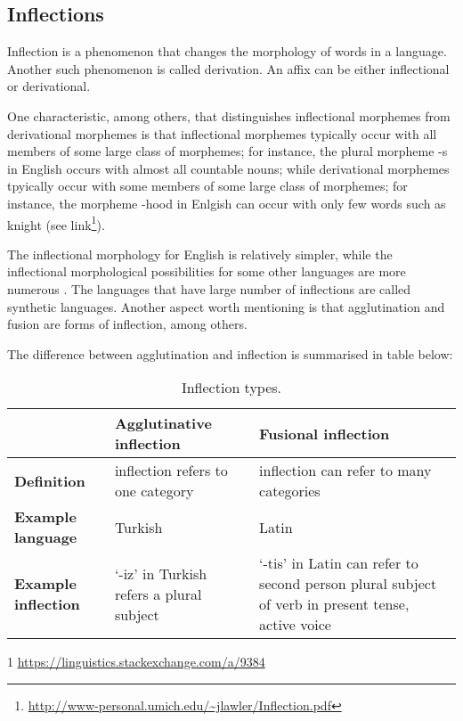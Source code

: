 \subsection{Inflections}
Inflection is a phenomenon that changes the morphology of words in a language. Another such phenomenon is called derivation. An affix can be either inflectional or derivational. 

One characteristic, among others, that distinguishes inflectional morphemes from derivational morphemes is that inflectional morphemes typically occur with all members of some large class of morphemes; for instance, the plural morpheme -s in English occurs with almost all countable nouns; while derivational morphemes tpyically occur with some members of some large class of morphemes; for instance, the morpheme -hood in Enlgish can occur with only few words such as knight (see link\footnote{\url{http://www-personal.umich.edu/~jlawler/Inflection.pdf}}).  

The inflectional morphology for English is relatively simpler, while the inflectional morphological possibilities for some other languages are more numerous \cite{indurkhya2010handbook}. The languages that have large number of inflections are called synthetic languages. Another aspect worth mentioning is that agglutination and fusion are forms of inflection, among others. 

The difference between agglutination and inflection is summarised in table below:


\begin{table}[H] \label{the-inflection-table}
	\centering
	\begin{threeparttable}
		\begin{tabularx}{\linewidth}{||>{\raggedright\arraybackslash}p{.8in}| >{\raggedright\arraybackslash}X >{\raggedright\arraybackslash}X||} 
			\hline
			\textbf{} &
			\textbf{Agglutinative inflection} & \textbf{Fusional inflection} \\ [0.5ex] 
			\hline\hline
			\textbf{Definition} & inflection refers to one category & inflection can refer to many categories \\
			\textbf{Example language} & Turkish  & Latin \\
			\textbf{Example inflection}  & `-iz' in Turkish refers a plural subject & `-tis' in Latin\tnote{1} can refer to second person plural subject of verb in present tense, active voice \\ [1ex]
			\hline
		\end{tabularx}
		\begin{tablenotes}
			\item[1] \url{https://linguistics.stackexchange.com/a/9384} 
		\end{tablenotes}
	\end{threeparttable}
	\caption{Inflection types.}
	\label{table:1e}
\end{table}

